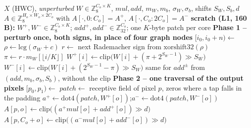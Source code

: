 \begin{algorithm}[t]
\caption{Fused dual-pass quantised ZO convolution (\texttt{PULP\_DualConv2d\_i8\_i8\_i8\_HWC}, ours)}
\label{alg:dualconv}
\begin{algorithmic}[1]
\Require $X$ (HWC), \emph{unperturbed} $W\in\mathbb{Z}_8^{C_o\times K}$, $\mathit{mul},\mathit{add}$, $m_W, m_b$, $\sigma_W,\sigma_b$, shifts $S_W, S_b, d$
\Ensure $A \in \mathbb{Z}_8^{H_o\times W_o\times 2C_o}$ with $A[\cdot,0{:}C_o]=A^{+}$, $A[\cdot,C_o{:}2C_o]=A^{-}$
\State \textbf{scratch (L1, 160\,B):} $W^{+}, W^{-}\in\mathbb{Z}_8^{C_o\times K}$;\; $\mathit{add}^{+},\mathit{add}^{-}\in\mathbb{Z}_{32}^{C_o}$;\; one $K$-byte patch per core
\Statex
\State \textbf{Phase 1 -- perturb once, both signs, in place of four graph nodes} 
\State $[i_0, i_0{+}n) \gets$                             
\State $\rho \gets \mathrm{lcg}(\sigma_W + c)$                                    
    \State $r \gets$ next Rademacher sign from $\mathrm{xorshift32}(\rho)$        
    \State $\pi \gets r \cdot m_W[\lfloor i/K \rfloor]$                           
    \State $W^{+}[i] \gets \mathrm{clip}\big(W[i] + (\pi + 2^{S_W-1}) \gg S_W\big)$
    \State $W^{-}[i] \gets \mathrm{clip}\big(W[i] + (2^{S_W-1} - \pi) \gg S_W\big)$ 
\EndFor
\State same for $\mathit{add}^{\pm}$ from $(\mathit{add}, m_b, \sigma_b, S_b)$, without the clip
\State {}                                                            
\Statex
\State \textbf{Phase 2 -- one traversal of the output pixels} 
\State $[p_0, p_1) \gets$                           
    \State $\mathit{patch} \gets$ receptive field of pixel $p$, zeros where a tap falls in the padding   
        \State $a^{+} \gets \mathrm{dot4}(\mathit{patch}, W^{+}[o])$;\quad $a^{-} \gets \mathrm{dot4}(\mathit{patch}, W^{-}[o])$   
        \State $A[p, o] \gets \mathrm{clip}\big((a^{+}\mathit{mul}[o] + \mathit{add}^{+}[o]) \gg d\big)$          
        \State $A[p, C_o + o] \gets \mathrm{clip}\big((a^{-}\mathit{mul}[o] + \mathit{add}^{-}[o]) \gg d\big)$
    \EndFor
\EndFor
\State {}
\Statex
\State {}
\State {}
\end{algorithmic}
\end{algorithm}
